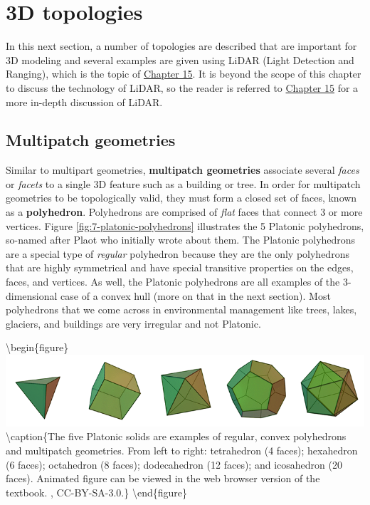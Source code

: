 \documentclass[
]{book}
\begin{document}
\hypertarget{d-topologies}{%
\section{3D topologies}\label{d-topologies}}

In this next section, a number of topologies are described that are important for 3D modeling and several examples are given using LiDAR (Light Detection and Ranging), which is the topic of \href{https://ubc-geomatics-textbook.github.io/geomatics-textbook/LiDAR-acquisition-and-analysis.html}{Chapter 15}. It is beyond the scope of this chapter to discuss the technology of LiDAR, so the reader is referred to \href{https://ubc-geomatics-textbook.github.io/geomatics-textbook/LiDAR-acquisition-and-analysis.html}{Chapter 15} for a more in-depth discussion of LiDAR.

\hypertarget{multipatch-geometries}{%
\subsection{Multipatch geometries}\label{multipatch-geometries}}

Similar to multipart geometries, \textbf{multipatch geometries} associate several \emph{faces} or \emph{facets} to a single 3D feature such as a building or tree. In order for multipatch geometries to be topologically valid, they must form a closed set of faces, known as a \textbf{polyhedron}. Polyhedrons are comprised of \emph{flat} faces that connect 3 or more vertices. Figure \ref{fig:7-platonic-polyhedrons} illustrates the 5 Platonic polyhedrons, so-named after Plaot who initially wrote about them. The Platonic polyhedrons are a special type of \emph{regular} polyhedron because they are the only polyhedrons that are highly symmetrical and have special transitive properties on the edges, faces, and vertices. As well, the Platonic polyhedrons are all examples of the 3-dimensional case of a convex hull (more on that in the next section). Most polyhedrons that we come across in environmental management like trees, lakes, glaciers, and buildings are very irregular and not Platonic.

\textbackslash begin\{figure\}
\includegraphics[width=0.75\linewidth]{images/07-platonic-polyhedrons} \textbackslash caption\{The five Platonic solids are examples of regular, convex polyhedrons and multipatch geometries. From left to right: tetrahedron (4 faces); hexahedron (6 faces); octahedron (8 faces); dodecahedron (12 faces); and icosahedron (20 faces). Animated figure can be viewed in the web browser version of the textbook. \citet{cyp_polyhedra_2005}, CC-BY-SA-3.0.\}\label{fig:7-platonic-polyhedrons}
\textbackslash end\{figure\}
\end{document}

